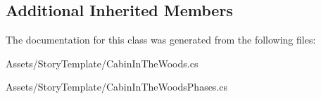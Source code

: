 \subsection*{Additional Inherited Members}


The documentation for this class was generated from the following files\+:\begin{DoxyCompactItemize}
\item 
Assets/\+Story\+Template/Cabin\+In\+The\+Woods.\+cs\item 
Assets/\+Story\+Template/Cabin\+In\+The\+Woods\+Phases.\+cs\end{DoxyCompactItemize}
